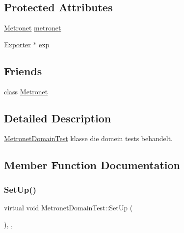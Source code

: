 \subsection*{Protected Attributes}
\begin{DoxyCompactItemize}
\item 
\hyperlink{class_metronet}{Metronet} \hyperlink{class_metronet_domain_test_aa185f99af6607124a6fea8c4f63fddb7}{metronet}
\item 
\hyperlink{class_exporter}{Exporter} $\ast$ \hyperlink{class_metronet_domain_test_a6e7c903d4485d95a766f8ff01989d529}{exp}
\end{DoxyCompactItemize}
\subsection*{Friends}
\begin{DoxyCompactItemize}
\item 
class \hyperlink{class_metronet_domain_test_a07c94fb69880743e62f64a941fc2d4ab}{Metronet}
\end{DoxyCompactItemize}


\subsection{Detailed Description}
\hyperlink{class_metronet_domain_test}{Metronet\+Domain\+Test} klasse die domein tests behandelt. 

\subsection{Member Function Documentation}
\mbox{\label{class_metronet_domain_test_ac8e8d15b45d53810c4427084fad6388f}} 
\subsubsection{\texorpdfstring{Set\+Up()}{SetUp()}}
{\footnotesize\ttfamily virtual void Metronet\+Domain\+Test\+::\+Set\+Up (\begin{DoxyParamCaption}{ }\end{DoxyParamCaption})\hspace{0.3cm}{\ttfamily [inline]}, {\ttfamily [protected]}, {\ttfamily [virtual]}}

\mbox{\label{class_metronet_domain_test_a3429b373771815652c80d013f81369a0}} 
